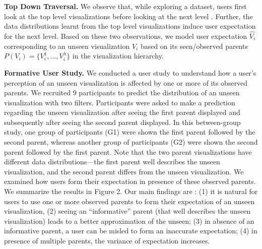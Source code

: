 \textbf{Top Down Traversal.} We observe that, while exploring a dataset, users first look at the top level visualizations before looking at the next level \cite{Kim2017, Hullman2013}. Further, the data distributions learnt from the top level visualizations induce user expectation for the next level. Based on these two observations, we model user expectation $\hat{V_i}$ corresponding to an unseen visualization $V_i$ based on its seen/observed parents $P(V_i) = \{V_i^1, \ldots, V_i^\lambda\}$ in the visualization hierarchy. 

\textbf{Formative User Study.} We conducted a user study to understand how a user's perception of an unseen visualization is affected by one or more of its observed parents. We recruited 9 participants to predict the distribution of an unseen visualization with two filters. Participants were asked to make a prediction regarding the unseen visualization after seeing the first parent displayed and subsequently after seeing the second parent displayed. In this between-group study, one group of participants (G1) were shown the first parent followed by the second parent, whereas another group of participants (G2) were shown the second parent followed by the first parent. Note that the two parent visualizations have different data distributions---the first parent well describes the unseen visualization, and the second parent differs from the unseen visualization. We examined how users form their expectation in presence of these observed parents. We summarize the results in Figure 2. Our main findings are : (1) it is natural for users to use one or more observed parents to form their expectation of an unseen visualization, (2) seeing an ``informative'' parent (that well describes the unseen visualization) leads to a better approximation of the unseen; (3) in absence of an informative parent, a user can be misled to form an inaccurate expectation; (4) in presence of multiple parents, the variance of expectation increases.
